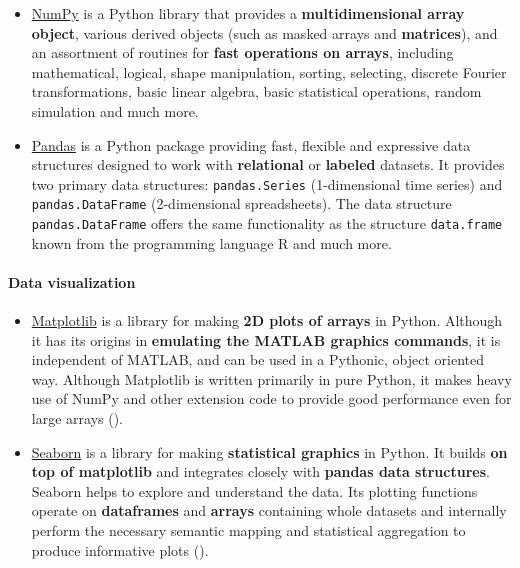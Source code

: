 \documentclass [oneside,10pt,a4paper,ngerman,BCOR10mm,headsepline,parindent,final]{scrartcl}
\begin{document}
\begin{itemize}
\item
  \href{https://numpy.org/devdocs/user/whatisnumpy.html}{NumPy} is a
  Python library that provides a \textbf{multidimensional array object},
  various derived objects (such as masked arrays and \textbf{matrices}),
  and an assortment of routines for \textbf{fast operations on arrays},
  including mathematical, logical, shape manipulation, sorting,
  selecting, discrete Fourier transformations, basic linear algebra,
  basic statistical operations, random simulation and much more.
\item
  \href{https://pandas.pydata.org/docs/getting_started/overview.html}{Pandas}
  is a Python package providing fast, flexible and expressive data
  structures designed to work with \textbf{relational} or
  \textbf{labeled} datasets. It provides two primary data structures:
  \texttt{pandas.Series} (1-dimensional time series) and
  \texttt{pandas.DataFrame} (2-dimensional spreadsheets). The data
  structure \texttt{pandas.DataFrame} offers the same functionality as
  the structure \texttt{data.frame} known from the programming language
  R and much more.
\end{itemize}

    \hypertarget{data-visualization}{%
\paragraph{Data visualization}\label{data-visualization}}

\begin{itemize}
\item
  \href{https://matplotlib.org}{Matplotlib} is a library for making
  \textbf{2D plots of arrays} in Python. Although it has its origins in
  \textbf{emulating the MATLAB graphics commands}, it is independent of
  MATLAB, and can be used in a Pythonic, object oriented way. Although
  Matplotlib is written primarily in pure Python, it makes heavy use of
  NumPy and other extension code to provide good performance even for
  large arrays (\cite{Hunter_matplotlib_2007}).
\item
  \href{https://seaborn.pydata.org/}{Seaborn} is a library for making
  \textbf{statistical graphics} in Python. It builds \textbf{on top of
  matplotlib} and integrates closely with \textbf{pandas data
  structures}. Seaborn helps to explore and understand the data. Its
  plotting functions operate on \textbf{dataframes} and \textbf{arrays}
  containing whole datasets and internally perform the necessary
  semantic mapping and statistical aggregation to produce informative
  plots (\cite{Waskom_seaborn_2021}).
\end{itemize}
\end{document}
